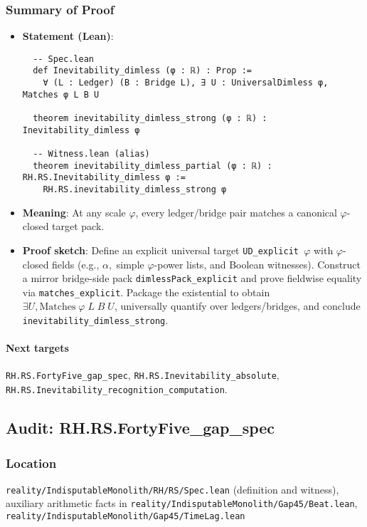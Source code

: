 \documentclass{article}
\newcommand{\FileRef}[1]{\texttt{#1}}
\begin{document}
\subsubsection{Summary of Proof}
\begin{itemize}[leftmargin=*]
  \item \textbf{Statement (Lean)}:
  \begin{lstlisting}
  -- Spec.lean
  def Inevitability_dimless (φ : ℝ) : Prop :=
    ∀ (L : Ledger) (B : Bridge L), ∃ U : UniversalDimless φ, Matches φ L B U

  theorem inevitability_dimless_strong (φ : ℝ) : Inevitability_dimless φ

  -- Witness.lean (alias)
  theorem inevitability_dimless_partial (φ : ℝ) : RH.RS.Inevitability_dimless φ :=
    RH.RS.inevitability_dimless_strong φ
  \end{lstlisting}
  \item \textbf{Meaning}: At any scale \(\varphi\), every ledger/bridge pair matches a canonical \(\varphi\)-closed target pack.
  \item \textbf{Proof sketch}: Define an explicit universal target \texttt{UD\_explicit \(\varphi\)} with \(\varphi\)-closed fields (e.g., \(\alpha,\) simple \(\varphi\)-power lists, and Boolean witnesses). Construct a mirror bridge-side pack \texttt{dimlessPack\_explicit} and prove fieldwise equality via \texttt{matches\_explicit}. Package the existential to obtain \(\exists U, \mathrm{Matches}\;\varphi\;L\;B\;U\), universally quantify over ledgers/bridges, and conclude \texttt{inevitability\_dimless\_strong}.
\end{itemize}

\paragraph{Next targets} \texttt{RH.RS.FortyFive\_gap\_spec}, \texttt{RH.RS.Inevitability\_absolute}, \texttt{RH.RS.Inevitability\_recognition\_computation}.

\subsection{Audit: RH.RS.FortyFive\_gap\_spec}
\subsubsection{Location}
\FileRef{reality/IndisputableMonolith/RH/RS/Spec.lean} (definition and witness),\\
auxiliary arithmetic facts in \FileRef{reality/IndisputableMonolith/Gap45/Beat.lean}, \FileRef{reality/IndisputableMonolith/Gap45/TimeLag.lean}
\end{document}
